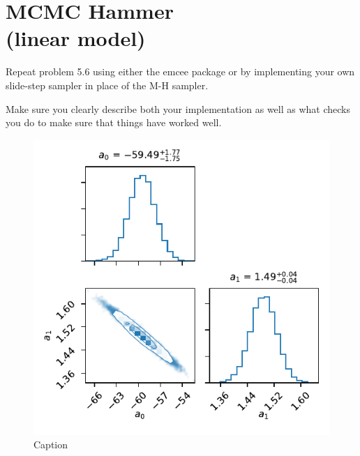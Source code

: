 \section{MCMC Hammer \\(linear model)}
Repeat problem 5.6 using either the
emcee package or by implementing your own slide-step sampler in place of the M-H sampler.

Make sure you clearly describe both your implementation as well as what checks you do to
make sure that things have worked well.

\begin{figure}
    \centering
    \includegraphics{CodeAndFigures/LinearModelEmcee.pdf}
    \caption{Caption}
    \label{fig:linearEmcee}
\end{figure}


